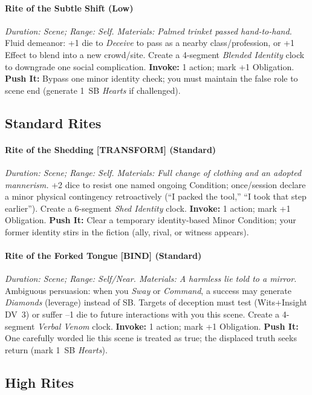 \paragraph{Rite of the Subtle Shift (Low)}%
\emph{Duration: Scene; Range: Self. Materials: Palmed trinket passed hand-to-hand.}  
Fluid demeanor: +1 die to \emph{Deceive} to pass as a nearby class/profession, or +1 Effect to blend into a new crowd/site. Create a 4-segment \emph{Blended Identity} clock to downgrade one social complication.  
\textbf{Invoke:} 1 action; mark +1 Obligation.  
\textbf{Push It:} Bypass one minor identity check; you must maintain the false role to scene end (generate 1~SB \emph{Hearts} if challenged).

\subsection*{Standard Rites}
\paragraph{Rite of the Shedding [TRANSFORM] (Standard)}%
\emph{Duration: Scene; Range: Self. Materials: Full change of clothing and an adopted mannerism.}  
+2 dice to resist one named ongoing Condition; once/session declare a minor physical contingency retroactively (``I packed the tool,'' ``I took that step earlier''). Create a 6-segment \emph{Shed Identity} clock.  
\textbf{Invoke:} 1 action; mark +1 Obligation.  
\textbf{Push It:} Clear a temporary identity-based Minor Condition; your former identity stirs in the fiction (ally, rival, or witness appears).

\paragraph{Rite of the Forked Tongue [BIND] (Standard)}%
\emph{Duration: Scene; Range: Self/Near. Materials: A harmless lie told to a mirror.}  
Ambiguous persuasion: when you \emph{Sway} or \emph{Command}, a success may generate \emph{Diamonds} (leverage) instead of SB. Targets of deception must test (Wits+Insight DV~3) or suffer --1 die to future interactions with you this scene. Create a 4-segment \emph{Verbal Venom} clock.  
\textbf{Invoke:} 1 action; mark +1 Obligation.  
\textbf{Push It:} One carefully worded lie this scene is treated as true; the displaced truth seeks return (mark 1~SB \emph{Hearts}).

\subsection*{High Rites}
